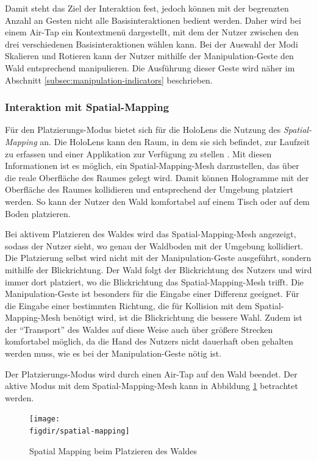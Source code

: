Damit steht das Ziel der Interaktion fest, jedoch können mit der begrenzten Anzahl an Gesten nicht alle Basisinteraktionen bedient werden. Daher wird bei einem Air-Tap ein Kontextmenü dargestellt, mit dem der Nutzer zwischen den drei verschiedenen Basisinteraktionen wählen kann. Bei der Auswahl der Modi Skalieren und Rotieren kann der Nutzer mithilfe der Manipulation-Geste den Wald entsprechend manipulieren. Die Ausführung dieser Geste wird näher im Abschnitt \ref{subsec:manipulation-indicators} beschrieben.

\subsubsection*{Interaktion mit Spatial-Mapping}
Für den Platzierungs-Modus bietet sich für die HoloLens die Nutzung des \textit{Spatial-Mapping} an. Die HoloLens kann den Raum, in dem sie sich befindet, zur Laufzeit zu erfassen und einer Applikation zur Verfügung zu stellen \cite{windows2017spacial}. Mit diesen Informationen ist es möglich, ein Spatial-Mapping-Mesh darzustellen, das über die reale Oberfläche des Raumes gelegt wird. Damit können Hologramme mit der Oberfläche des Raumes kollidieren und entsprechend der Umgebung platziert werden. So kann der Nutzer den Wald komfortabel auf einem Tisch oder auf dem Boden platzieren.

Bei aktivem Platzieren des Waldes wird das Spatial-Mapping-Mesh angezeigt, sodass der Nutzer sieht, wo genau der Waldboden mit der Umgebung kollidiert. Die Platzierung selbst wird nicht mit der Manipulation-Geste ausgeführt, sondern mithilfe der Blickrichtung. Der Wald folgt der Blickrichtung des Nutzers und wird immer dort platziert, wo die Blickrichtung das Spatial-Mapping-Mesh trifft. Die Manipulation-Geste ist besonders für die Eingabe einer Differenz geeignet. Für die Eingabe einer bestimmten Richtung, die für Kollision mit dem Spatial-Mapping-Mesh benötigt wird, ist die Blickrichtung die bessere Wahl. Zudem ist der "`Transport"' des Waldes auf diese Weise auch über größere Strecken komfortabel möglich, da die Hand des Nutzers nicht dauerhaft oben gehalten werden muss, wie es bei der Manipulation-Geste nötig ist.

Der Platzierungs-Modus wird durch einen Air-Tap auf den Wald beendet. Der aktive Modus mit dem Spatial-Mapping-Mesh kann in Abbildung \ref{fig:spatial-mapping} betrachtet werden.

\begin{figure}[htb]
  \texttt{[image: \\figdir/spatial-mapping]}
  \caption{Spatial Mapping beim Platzieren des Waldes}
  \label{fig:spatial-mapping}
\end{figure}

